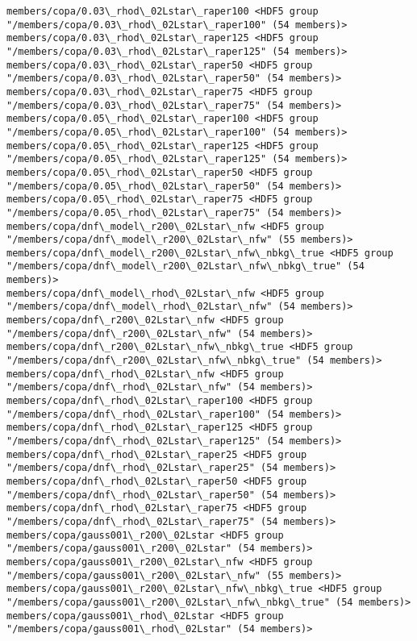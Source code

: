 \documentclass[11pt]{article}
\begin{document}
\begin{Verbatim}[commandchars=\\\{\}]
members/copa/0.03\_rhod\_02Lstar\_raper100 <HDF5 group "/members/copa/0.03\_rhod\_02Lstar\_raper100" (54 members)>
members/copa/0.03\_rhod\_02Lstar\_raper125 <HDF5 group "/members/copa/0.03\_rhod\_02Lstar\_raper125" (54 members)>
members/copa/0.03\_rhod\_02Lstar\_raper50 <HDF5 group "/members/copa/0.03\_rhod\_02Lstar\_raper50" (54 members)>
members/copa/0.03\_rhod\_02Lstar\_raper75 <HDF5 group "/members/copa/0.03\_rhod\_02Lstar\_raper75" (54 members)>
members/copa/0.05\_rhod\_02Lstar\_raper100 <HDF5 group "/members/copa/0.05\_rhod\_02Lstar\_raper100" (54 members)>
members/copa/0.05\_rhod\_02Lstar\_raper125 <HDF5 group "/members/copa/0.05\_rhod\_02Lstar\_raper125" (54 members)>
members/copa/0.05\_rhod\_02Lstar\_raper50 <HDF5 group "/members/copa/0.05\_rhod\_02Lstar\_raper50" (54 members)>
members/copa/0.05\_rhod\_02Lstar\_raper75 <HDF5 group "/members/copa/0.05\_rhod\_02Lstar\_raper75" (54 members)>
members/copa/dnf\_model\_r200\_02Lstar\_nfw <HDF5 group "/members/copa/dnf\_model\_r200\_02Lstar\_nfw" (55 members)>
members/copa/dnf\_model\_r200\_02Lstar\_nfw\_nbkg\_true <HDF5 group "/members/copa/dnf\_model\_r200\_02Lstar\_nfw\_nbkg\_true" (54 members)>
members/copa/dnf\_model\_rhod\_02Lstar\_nfw <HDF5 group "/members/copa/dnf\_model\_rhod\_02Lstar\_nfw" (54 members)>
members/copa/dnf\_r200\_02Lstar\_nfw <HDF5 group "/members/copa/dnf\_r200\_02Lstar\_nfw" (54 members)>
members/copa/dnf\_r200\_02Lstar\_nfw\_nbkg\_true <HDF5 group "/members/copa/dnf\_r200\_02Lstar\_nfw\_nbkg\_true" (54 members)>
members/copa/dnf\_rhod\_02Lstar\_nfw <HDF5 group "/members/copa/dnf\_rhod\_02Lstar\_nfw" (54 members)>
members/copa/dnf\_rhod\_02Lstar\_raper100 <HDF5 group "/members/copa/dnf\_rhod\_02Lstar\_raper100" (54 members)>
members/copa/dnf\_rhod\_02Lstar\_raper125 <HDF5 group "/members/copa/dnf\_rhod\_02Lstar\_raper125" (54 members)>
members/copa/dnf\_rhod\_02Lstar\_raper25 <HDF5 group "/members/copa/dnf\_rhod\_02Lstar\_raper25" (54 members)>
members/copa/dnf\_rhod\_02Lstar\_raper50 <HDF5 group "/members/copa/dnf\_rhod\_02Lstar\_raper50" (54 members)>
members/copa/dnf\_rhod\_02Lstar\_raper75 <HDF5 group "/members/copa/dnf\_rhod\_02Lstar\_raper75" (54 members)>
members/copa/gauss001\_r200\_02Lstar <HDF5 group "/members/copa/gauss001\_r200\_02Lstar" (54 members)>
members/copa/gauss001\_r200\_02Lstar\_nfw <HDF5 group "/members/copa/gauss001\_r200\_02Lstar\_nfw" (55 members)>
members/copa/gauss001\_r200\_02Lstar\_nfw\_nbkg\_true <HDF5 group "/members/copa/gauss001\_r200\_02Lstar\_nfw\_nbkg\_true" (54 members)>
members/copa/gauss001\_rhod\_02Lstar <HDF5 group "/members/copa/gauss001\_rhod\_02Lstar" (54 members)>

\end{Verbatim}
\end{document}
